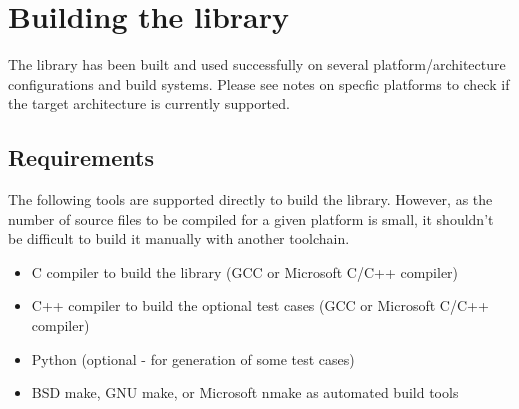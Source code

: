 %
%
%
%

\newpage
\section{Building the library}

The library has been built and used successfully on several 
platform/architecture configurations and build systems.
Please see notes on specfic platforms to check if the target
architecture is currently supported.


\subsection{Requirements}

The following tools are supported directly to build the  library.
However, as the number of source files to be compiled for a given
platform is small, it shouldn't be difficult to build it manually with
another toolchain.
\begin{itemize}
\item C compiler to build the  library (GCC or Microsoft C/C++ compiler)
\item C++ compiler to build the optional test cases (GCC or Microsoft C/C++ compiler)
\item Python (optional - for generation of some test cases)
\item BSD make, GNU make, or Microsoft nmake as automated build tools
\end{itemize}


